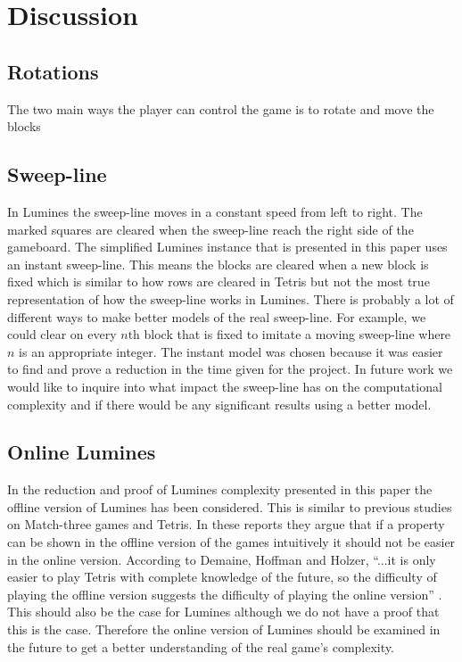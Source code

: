 \section{Discussion}
\label{discussion}

\subsection{Rotations}

The two main ways the player can control the game is to rotate and move the blocks

\subsection{Sweep-line}

In Lumines the sweep-line moves in a constant speed from left to right. The marked squares are cleared when the sweep-line reach the right side of the gameboard. The simplified Lumines instance that is presented in this paper uses an instant sweep-line. This means the blocks are cleared when a new block is fixed which is similar to how rows are cleared in Tetris but not the most true representation of how the sweep-line works in Lumines. There is probably a lot of different ways to make better models of the real sweep-line. For example, we could clear on every $n\text{th}$ block that is fixed to imitate a moving sweep-line where $n$ is an appropriate integer. The instant model was chosen because it was easier to find and prove a reduction in the time given for the project. In future work we would like to inquire into what impact the sweep-line has on the computational complexity and if there would be any significant results using a better model.

\subsection{Online Lumines}

In the reduction and proof of Lumines complexity presented in this paper the offline version of Lumines has been considered. This is similar to previous studies on Match-three games and Tetris. In these reports they argue that if a property can be shown in the offline version of the games intuitively it should not be easier in the online version. According to Demaine, Hoffman and Holzer, ``...it is only easier to play Tetris with complete knowledge of the future, so the difficulty of playing the offline version suggests the difficulty of playing the online version'' \cite[p. 2]{tetris}. This should also be the case for Lumines although we do not have a proof that this is the case. Therefore the online version of Lumines should be examined in the future to get a better understanding of the real game's complexity.
